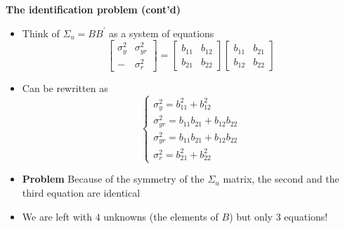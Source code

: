 \begin{frame}
{\textbf{The identification problem (cont'd)\smallskip }}

\begin{itemize}
\item Think of $\Sigma _{u}=BB^{\prime }$ as a system of equations 
\begin{equation*}
\left[ 
\begin{array}{cc}
\sigma _{y}^{2} & \sigma _{yr}^{2} \\ 
- & \sigma _{r}^{2}%
\end{array}%
\right] =\left[ 
\begin{array}{cc}
b_{11} & b_{12} \\ 
b_{21} & b_{22}%
\end{array}%
\right] \left[ 
\begin{array}{cc}
b_{11} & b_{21} \\ 
b_{12} & b_{22}%
\end{array}%
\right]
\end{equation*}

\item Can be rewritten as%
\begin{equation*}
\left\{ 
\begin{array}{l}
\sigma _{y}^{2}=b_{11}^{2}+b_{12}^{2} \\ 
\sigma _{yr}^{2}=b_{11}b_{21}+b_{12}b_{22} \\ 
\sigma _{yr}^{2}=b_{11}b_{21}+b_{12}b_{22} \\ 
\sigma _{r}^{2}=b_{21}^{2}+b_{22}^{2}%
\end{array}%
\right.
\end{equation*}

\item \textbf{Problem} Because of the symmetry of the $\Sigma _{u}$ matrix,
the second and the third equation are identical\bigskip

\item We are left with $4$ unknowns (the elements of $B$) but only $3$
equations!
\end{itemize}
\end{frame}


